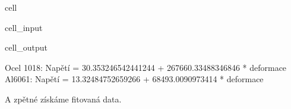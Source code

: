\documentclass[letterpaper,10pt,english]{jupyterBook}
\begin{document}
{{\begin{sphinxuseclass}{cell}\begin{sphinxVerbatimInput}

\begin{sphinxuseclass}{cell_input}
\begin{sphinxVerbatim}[commandchars=\\\{\}]
    
    

\PYG{p}{[}\PYG{p}{]}\PYG{p}{[}\PYG{p}{]}
\PYG{p}{[}\PYG{p}{]}\PYG{p}{[}\PYG{p}{]}
\end{sphinxVerbatim}

\end{sphinxuseclass}\end{sphinxVerbatimInput}
\begin{sphinxVerbatimOutput}

\begin{sphinxuseclass}{cell_output}
\begin{sphinxVerbatim}[commandchars=\\\{\}]
Ocel 1018: Napětí = 30.353246542441244 + 267660.33488346846 * deformace
Al6061: Napětí = \PYGZhy{}13.32484752659266 + 68493.0090973414 * deformace
\end{sphinxVerbatim}

\end{sphinxuseclass}\end{sphinxVerbatimOutput}

\end{sphinxuseclass}
\sphinxAtStartPar
A zpětné získáme fitovaná data.

}}
\end{document}

